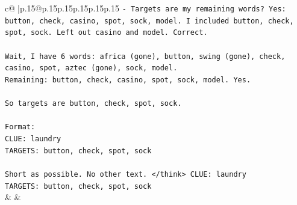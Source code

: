 \documentclass{article}
\begin{document}
{\begin{supertabular}{c@{$\;$}|p{.15\linewidth}@{}p{.15\linewidth}p{.15\linewidth}p{.15\linewidth}p{.15\linewidth}p{.15\linewidth}}
{{{\texttt{{-} Targets are my remaining words? Yes: button, check, casino, spot, sock, model. I included button, check, spot, sock. Left out casino and model. Correct.} \\
\\ 
\texttt{Wait, I have 6 words: africa (gone), button, swing (gone), check, casino, spot, aztec (gone), sock, model.} \\
\texttt{Remaining: button, check, casino, spot, sock, model. Yes.} \\
\\ 
\texttt{So targets are button, check, spot, sock.} \\
\\ 
\texttt{Format:} \\
\texttt{CLUE: laundry} \\
\texttt{TARGETS: button, check, spot, sock} \\
\\ 
\texttt{Short as possible. No other text. </think> CLUE: laundry} \\
\texttt{TARGETS: button, check, spot, sock} \\
            }
        }
    }
    & & \\ \\


\end{supertabular}}
\end{document}
